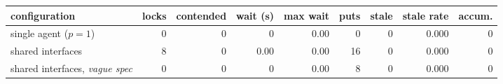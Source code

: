\begin{tabular}{lrrrrrrrr}
\toprule
configuration & locks & contended & wait (s) & max wait & puts & stale & stale rate & accum. \\
\midrule
single agent ($p{=}1$) & 0 & 0 & 0 & 0.00 & 0 & 0 & 0.000 & 0 \\
shared interfaces & 8 & 0 & 0.00 & 0.00 & 16 & 0 & 0.000 & 0 \\
shared interfaces, \emph{vague spec} & 0 & 0 & 0 & 0.00 & 8 & 0 & 0.000 & 0 \\
\bottomrule
\end{tabular}
